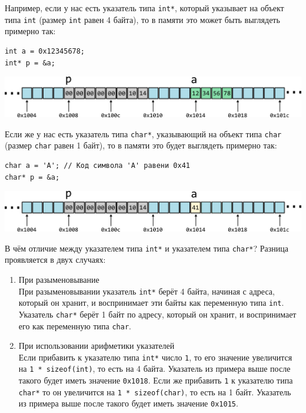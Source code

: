\documentclass[10pt]{article}
\begin{document}
Например, если у нас есть указатель типа \texttt{int*}, который указывает на объект типа \texttt{int} (размер \texttt{int} равен 4 байта), то в памяти это может быть выглядеть примерно так:
\begin{lstlisting}
int a = 0x12345678;
int* p = &a;
\end{lstlisting}

\begin{center}
\includegraphics[scale=1]{../images/memory_3_pointer_to_int_b.png}
\end{center}

Если же у нас есть указатель типа \texttt{char*}, указывающий на объект типа \texttt{char} (размер \texttt{char} равен 1 байт), то в памяти это будет выглядеть примерно так:
\begin{lstlisting}
char a = 'A'; // Код символа 'A' равени 0x41 
char* p = &a;
\end{lstlisting}

\begin{center}
\includegraphics[scale=1]{../images/memory_3_pointer_to_char_b.png}
\end{center}

\newpage
В чём отличие между указателем типа \texttt{int*} и указателем типа \texttt{char*}? Разница проявляется в двух случаях:
\begin{enumerate}
\item При разыменовывание\\
При разыменовывании указатель \texttt{int*} берёт 4 байта, начиная с адреса, который он хранит, и воспринимает эти байты как переменную типа \texttt{int}. Указатель \texttt{char*} берёт 1 байт по адресу, который он хранит, и воспринимает его как переменную типа \texttt{char}.

\item При использовании арифметики указателей\\
Если прибавить к указателю типа \texttt{int*} число \texttt{1}, то его значение увеличится на \texttt{1 * sizeof(int)}, то есть на 4 байта. Указатель из примера выше после такого будет иметь значение \texttt{0x1018}. Если же прибавить \texttt{1} к указателю типа \texttt{char*} то он увеличится на \texttt{1 * sizeof(char)}, то есть на 1 байт. Указатель из примера выше после такого будет иметь значение \texttt{0x1015}.
\end{enumerate}
\end{document}
